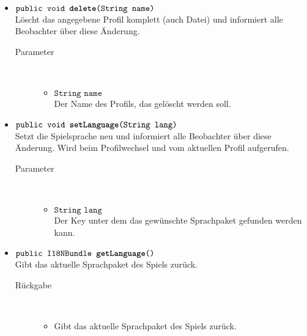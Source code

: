 \begin{description}
\begin{itemize}
		\item $\texttt{public void \textbf{delete}(String name)}$ \\ Löscht das angegebene Profil komplett (auch Datei) und informiert alle Beobachter über diese Änderung.
		\begin{description}
			\item[Parameter] \hfill \\
			\vspace{-.8cm}
			\begin{itemize}
				\item $\texttt{String name}$ \\ Der Name des Profils, das gelöscht werden soll.
			\end{itemize}
		\end{description}
		
		\item $\texttt{public void \textbf{setLanguage}(String lang)}$ \\ Setzt die Spielsprache neu und informiert alle Beobachter über diese Änderung.
		Wird beim Profilwechsel und vom aktuellen Profil aufgerufen.
		\begin{description}
			\item[Parameter] \hfill \\
			\vspace{-.8cm}
			\begin{itemize}
				\item $\texttt{String lang}$ \\ Der Key unter dem das gewünschte Sprachpaket gefunden werden kann.
			\end{itemize}
		\end{description}
		
		\item $\texttt{public I18NBundle \textbf{getLanguage}()}$ \\ Gibt das aktuelle Sprachpaket des Spiels zurück.
		\begin{description}
			\item[Rückgabe] \hfill \\
			\vspace{-.8cm}
			\begin{itemize}
				\item Gibt das aktuelle Sprachpaket des Spiels zurück.
			\end{itemize}
		\end{description}
	\end{itemize}
\end{description}

